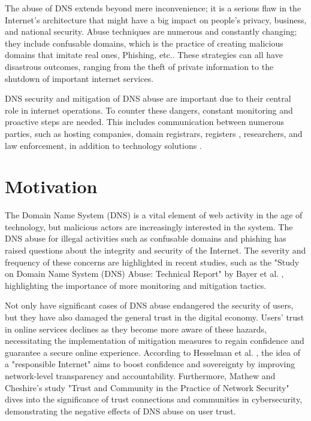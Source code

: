 The abuse of DNS extends beyond mere inconvenience; it is a serious flaw in the Internet's architecture that might have a big impact on people's privacy, business, and national security. Abuse techniques are numerous and constantly changing; they include confusable domains, which is the practice of creating malicious domains that imitate real ones, Phishing, etc.\cite{tatang2021}. These strategies can all have disastrous outcomes, ranging from the theft of private information to the shutdown of important internet services.

DNS security and mitigation of DNS abuse are important due to their central role in internet operations. To counter these dangers, constant monitoring and proactive steps are needed. This includes communication between numerous parties, such as hosting companies, domain registrars, registers , researchers, and law enforcement, in addition to technology solutions \cite{holdmann2019}.

\section{Motivation}

The Domain Name System (DNS) is a vital element of web activity in the age of technology, but malicious actors are increasingly interested in the system. The DNS abuse for illegal activities such as confusable domains and phishing has raised questions about the integrity and security of the Internet. The severity and frequency of these concerns are highlighted in recent studies, such as the "Study on Domain Name System (DNS) Abuse: Technical Report" by Bayer et al. \cite{bayer2022}, highlighting the importance of more monitoring and mitigation tactics.

Not only have significant cases of DNS abuse endangered the security of users, but they have also damaged the general trust in the digital economy. Users' trust in online services declines as they become more aware of these hazards, necessitating the implementation of mitigation measures to regain confidence and guarantee a secure online experience. According to Hesselman et al. \cite{hesselman2020}, the idea of a "responsible Internet" aims to boost confidence and sovereignty by improving network-level transparency and accountability. Furthermore, Mathew and Cheshire's \cite{mathew2016} study "Trust and Community in the Practice of Network Security" dives into the significance of trust connections and communities in cybersecurity, demonstrating the negative effects of DNS abuse on user trust.

